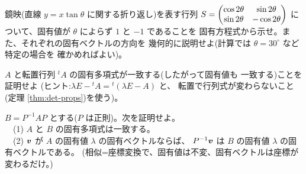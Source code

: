 \begin{mondai}[発展]\label{q:eigen-ex10}
鏡映(直線 $y = x \tan\theta$ に関する折り返し)を表す行列
$S = \begin{pmatrix}\cos 2\theta & \sin 2\theta \\ \sin 2\theta & -\cos 2\theta\end{pmatrix}$
について、固有値が $\theta$ によらず $1$ と $-1$ であることを
固有方程式から示せ。また、それぞれの固有ベクトルの方向を
幾何的に説明せよ(計算では $\theta = 30^\circ$ など特定の場合を
確かめればよい)。
\end{mondai}

\begin{mondai}[証明]\label{q:eigen-ex11}
$A$ と転置行列 ${}^t\!A$ の固有多項式が一致する(したがって固有値も
一致する)ことを証明せよ
(ヒント:$\lambda E - {}^t\!A = {}^t(\lambda E - A)$ と、
転置で行列式が変わらないこと(定理 \ref{thm:det-props})を使う)。
\end{mondai}

\begin{mondai}[証明]\label{q:eigen-ex12}
$B = P^{-1}AP$ とする($P$ は正則)。次を証明せよ。\\
　(1) $A$ と $B$ の固有多項式は一致する。\\
　(2) $\bm{v}$ が $A$ の固有値 $\lambda$ の固有ベクトルならば、
$P^{-1}\bm{v}$ は $B$ の固有値 $\lambda$ の固有ベクトルである。
(相似=座標変換で、固有値は不変、固有ベクトルは座標が変わるだけ。)
\end{mondai}

